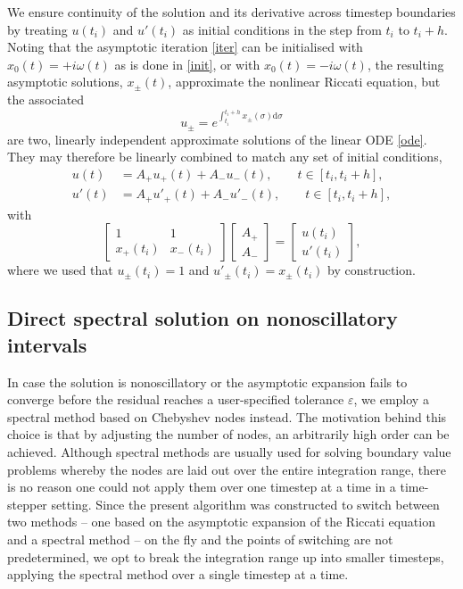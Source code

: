 \documentclass[10pt]{article}
\newcommand{\be}{\begin{equation}}
\newcommand{\ee}{\end{equation}}
\newcommand{\om}{\omega}
\begin{document}
We ensure continuity of the solution and its derivative across timestep
boundaries by treating $u(t_i)$ and $u'(t_i)$ as initial conditions in the step
from $t_i$ to  $t_i+h$. Noting that the asymptotic iteration \cref{iter} can be
initialised with $x_0(t) = +i\om(t)$ as is done in \cref{init}, or with $x_0(t)
= -i\om(t)$, the resulting asymptotic solutions, $x_{\pm}(t)$, approximate the
nonlinear Riccati equation, but the associated 
\be
u_{\pm} = e^{\int_{t_i}^{t_i+h}x_{\pm}(\sigma)\mathrm{d}\sigma}
\ee
are two, linearly independent approximate solutions of the linear ODE \cref{ode}.
They may therefore be linearly combined to match any set of initial conditions,
\begin{align}
    u(t) &= A_{+}u_{+}(t) + A_{-}u_{-}(t), \qquad t \in [t_i, t_i + h],\\
    u'(t) &= A_{+}u'_{+}(t) + A_{-}u'_{-}(t), \qquad t \in [t_i, t_i + h],
\end{align}
with 
\be
\begin{bmatrix}
    1 & 1 \\
    x_{+}(t_i) & x_{-}(t_i)
\end{bmatrix}
\begin{bmatrix}
    A_{+} \\
    A_{-}
\end{bmatrix}
= 
\begin{bmatrix}
    u(t_i) \\
    u'(t_i)
\end{bmatrix}, 
\ee
where we used that $u_{\pm}(t_i) = 1$ and $u'_{\pm}(t_i) = x_{\pm}(t_i)$ by construction.






\subsection{Direct spectral solution on nonoscillatory intervals \label{chebysteps}}

In case the solution is nonoscillatory or the asymptotic expansion fails to
converge before the residual reaches a user-specified tolerance $\varepsilon$, we
employ a spectral method based on Chebyshev nodes instead. The motivation
behind this choice is that by adjusting the number of nodes, an arbitrarily
high order can be achieved. Although spectral methods are usually used for
solving boundary value problems whereby the nodes are laid out over the entire
integration range, there is no reason one could not apply them over one timestep at a
time in a time-stepper setting. Since the present algorithm was constructed to
switch between two methods -- one based on the asymptotic expansion of the
Riccati equation and a spectral method -- on the fly and the points of
switching are not predetermined, we opt to break the integration range up into
smaller timesteps, applying the spectral method over a single timestep at a
time.
\end{document}
